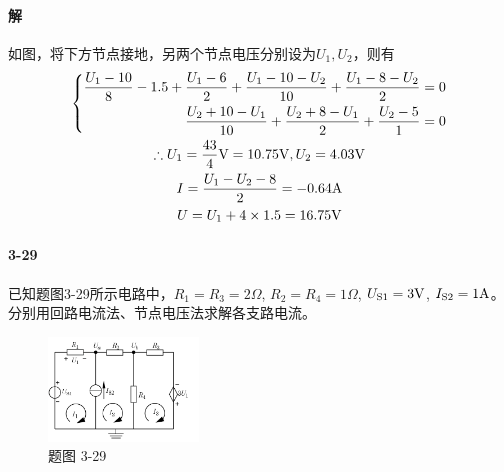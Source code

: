 \documentclass[hyperref, UTF8]{ctexart}
\newcommand{\volt}{{\rm V}}
\newcommand{\source}{{\rm S}}
\newcommand{\ampere}{{\rm A}}
\newcommand{\ohm}{\Omega}
\begin{document}
\paragraph{解}
如图，将下方节点接地，另两个节点电压分别设为$U_1, U_2$，则有
\begin{gather*}
    \left\{ \begin{aligned}
    \frac{U_1-10}{8}-1.5 + \frac{U_1-6}{2} + \frac{U_1-10-U_2}{10} + \frac{U_1-8-U_2}{2} & = 0 \\
    \frac{U_2+10-U_1}{10} + \frac{U_2+8-U_1}{2} + \frac{U_2-5}{1} & = 0
    \end{aligned} \right. \\
    \therefore U_1=\frac{43}{4}\volt=10.75\volt, U_2=4.03\volt \\
    I = \frac{U_1-U_2-8}{2}=-0.64\ampere \\
    U = U_1+4 \times 1.5 = 16.75\volt
\end{gather*}

\paragraph{3-29}\label{3-29}
已知题图3-29所示电路中，$R_1=R_3=2\ohm$, $R_2=R_4=1\ohm$, $U_{\source 1}=3\volt$, $I_{\source 2}=1\ampere$。分别用回路电流法、节点电压法求解各支路电流。

\begin{figure}[!htb]
\centering
\includegraphics[width=0.357\textwidth]{p3-29.png}
\caption*{题图 3-29}
\end{figure}
\end{document}
